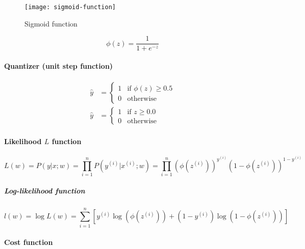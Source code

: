 \documentclass{article}
\begin{document}
			\begin{figure}
				\centering
				\texttt{[image: sigmoid-function]}
				\caption{Sigmoid function}
				\label{fig:sigmoid-function}
			\end{figure}
			
			\begin{equation}
				\phi(z) = \frac{1}{1+e^{-z}}
			\end{equation}
			
			\paragraph{Quantizer (unit step function)}
			
			\begin{equation}
				\begin{aligned}
					\hat{y} &= \begin{cases} 1 &\mbox{if } \phi(z) \geq 0.5 \\ 0 &\mbox{otherwise} \end{cases} \\
					\hat{y} &= \begin{cases} 1 &\mbox{if } z \geq 0.0 \\ 0 &\mbox{otherwise} \end{cases}
				\end{aligned}
			\end{equation}
					
			\paragraph{Likelihood $L$ function}
			
			\begin{equation}
				L(w) = P(y| x; w) = \prod_{i=1}^n P(y^{(i)} | x^{(i)}; w) = \prod_{i=1}^n (\phi(z^{(i)}))^{y^{(i)}}(1-\phi(z^{(i)}))^{1-y^{(i)}}
			\end{equation}
			
			\subparagraph{Log-likelihood function}
			
			\begin{equation}
				l(w) = \log L(w) = \sum_{i=1}^n [y^{(i)}\log(\phi(z^{(i)}))+(1-y^{(i)})\log(1-\phi(z^{(i)}))]
			\end{equation}
			
			\paragraph{Cost function}
			
\end{document}
